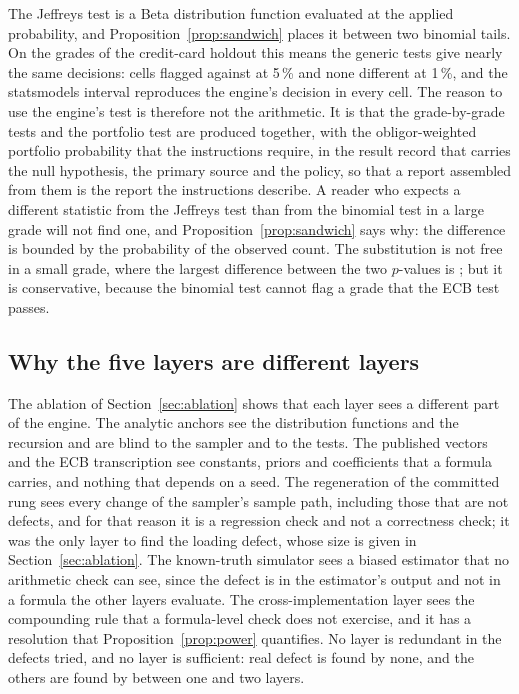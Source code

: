The Jeffreys test is a Beta distribution function evaluated at the applied probability, and Proposition~\ref{prop:sandwich} places it between two binomial tails. On the grades of the credit-card holdout this means the generic tests give nearly the same decisions: \flagJeffFive{} cells flagged against \flagBinFive{} at 5\,\% and none different at 1\,\%, and the statsmodels interval reproduces the engine's decision in every cell. The reason to use the engine's test is therefore not the arithmetic. It is that the grade-by-grade tests and the portfolio test are produced together, with the obligor-weighted portfolio probability that the instructions require, in the result record that carries the null hypothesis, the primary source and the policy, so that a report assembled from them is the report the instructions describe. A reader who expects a different statistic from the Jeffreys test than from the binomial test in a large grade will not find one, and Proposition~\ref{prop:sandwich} says why: the difference is bounded by the probability of the observed count. The substitution is not free in a small grade, where the largest difference between the two $p$-values is \maxPGap{}; but it is conservative, because the binomial test cannot flag a grade that the ECB test passes.

\subsection{Why the five layers are different layers}

The ablation of Section~\ref{sec:ablation} shows that each layer sees a different part of the engine. The analytic anchors see the distribution functions and the recursion and are blind to the sampler and to the tests. The published vectors and the ECB transcription see constants, priors and coefficients that a formula carries, and nothing that depends on a seed. The regeneration of the committed rung sees every change of the sampler's sample path, including those that are not defects, and for that reason it is a regression check and not a correctness check; it was the only layer to find the loading defect, whose size is given in Section~\ref{sec:ablation}. The known-truth simulator sees a biased estimator that no arithmetic check can see, since the defect is in the estimator's output and not in a formula the other layers evaluate. The cross-implementation layer sees the compounding rule that a formula-level check does not exercise, and it has a resolution that Proposition~\ref{prop:power} quantifies. No layer is redundant in the \ablReal{} defects tried, and no layer is sufficient: \ablNone{} real defect is found by none, and the others are found by between one and two layers.

